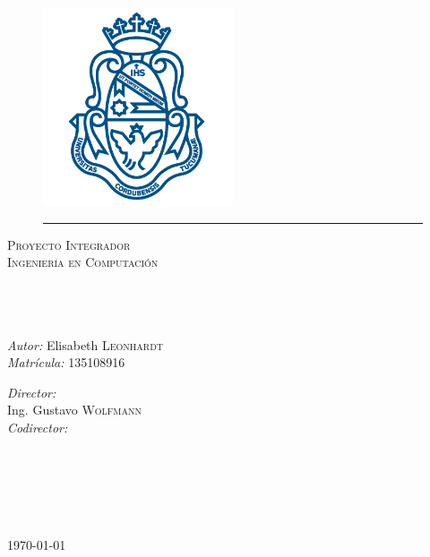 \documentclass[11pt, oneside]{Thesis} %
\begin{document}
\begin{titlepage}
\begin{center}
\textsc{\LARGE \univname}\\[1.5cm] %


\begin{figure}[htbp]
	\centering
		\includegraphics[width=0.5\textwidth]{Figures/logo.png}
		\rule{35em}{0.5pt}
\end{figure}


\textsc{\Large Proyecto Integrador}\\[0.5cm] %
\textsc{\Large Ingeniería en Computación}\\[0.5cm] %

\HRule \\[0.4cm] %
{\huge \bfseries \ttitle}\\[0.4cm] %
\HRule \\[1cm] %
 
\begin{minipage}[t]{0.4\textwidth}
\begin{flushleft} \large
\emph{Autor:}{ Elisabeth \textsc{Leonhardt}}\\ %
\emph{Matrícula: }{135108916}
\end{flushleft}
\end{minipage}
\begin{minipage}[t]{0.4\textwidth}
\begin{flushright} \large
\emph{Director:}\\{Ing. Gustavo \textsc{Wolfmann}} \\
\emph{Codirector:}\\{\supname}
\\~\\~\\ %
\end{flushright}
\end{minipage}

\facname\\~\\ %
 
{\large \today}\\ %
\vfill
\end{center}
\end{titlepage}
\end{document}
